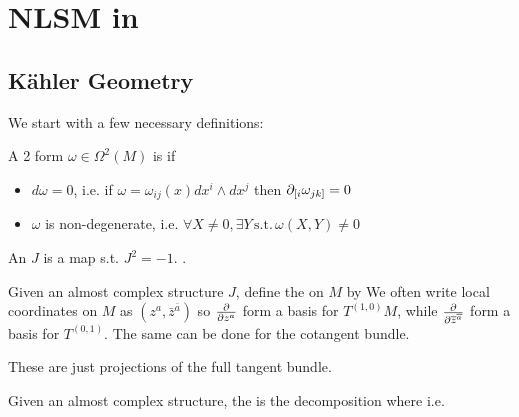 \documentclass{article}
\begin{document}
\section{NLSM in }


\subsection{K\"ahler Geometry}

We start with a few necessary definitions:

\begin{definition}
	    \item A 2 form $\omega\in\Omega^2(M)$ is  if
	        \begin{itemize}
	    	\item $d\omega = 0$, i.e. if $\omega = \omega_{ij}(x) dx^i \wedge dx^j$ then $\partial_{[i}\omega_{jk]}=0$
	    	\item $\omega$ is non-degenerate, i.e. $\forall X \neq 0, \exists Y \, \text{s.t.} \,  \omega(X,Y) \neq 0$
	    \end{itemize}
\end{definition}

\begin{definition}
	An  $J$ is a map 
	s.t. $J^2 = -1$. .
\end{definition}

\begin{definition}
Given an almost complex structure $J$, define the  on $M$ by 
We often write local coordinates on $M$ as $(z^a,\bar{z}^{\bar{a}})$ so $\frac{\partial}{\partial z^a}$ form a basis for $T^{(1,0)}M$, while $\frac{\partial}{\partial\overline{z}^{\overline{a}}}$ form a basis for $T^{(0,1)}$. 
The same can be done for the cotangent bundle. 
\end{definition}

\begin{remark}
	These are just projections of the full tangent bundle. 
\end{remark}

\begin{definition}
	Given an almost complex structure, the  is the decomposition 
where 
i.e. 
\end{definition}
\end{document}
